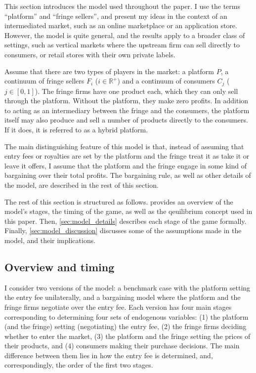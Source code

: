 \documentclass[a4paper]{article}
\begin{document}
This section introduces the model used throughout the paper.
I use the terms ``platform'' and ``fringe sellers'', and present my ideas in the context of an intermediated market, such as an online marketplace or an application store.
However, the model is quite general, and the results apply to a broader class of settings, such as vertical markets where the upstream firm can sell directly to consumers, or retail stores with their own private labels.

Assume that there are two types of players in the market: a platform $P$, a continuum of fringe sellers $F_i$ ($i \in \mathbb{R}^+$) and a continuum of consumers $C_j$ ($j \in [0, 1]$).
The fringe firms have one product each, which they can only sell through the platform.
Without the platform, they make zero profits.
In addition to acting as an intermediary between the fringe and the consumers, the platform itself may also produce and sell a number of products directly to the consumers.
If it does, it is referred to as a hybrid platform.

The main distinguishing feature of this model is that, instead of assuming that entry fees or royalties are set by the platform and the fringe treat it as take it or leave it offers, I assume that the platform and the fringe engage in some kind of bargaining over their total profits.
The bargaining rule, as well as other details of the model, are described in the rest of this section.

The rest of this section is structured as follows.
 provides an overview of the model's stages, the timing of the game, as well as the qeuilibrium concept used in this paper.
Then, \cref{sec:model_details} describes each stage of the game formally.
Finally, \cref{sec:model_discussion} discusses some of the assumptions made in the model, and their implications.

\subsection{Overview and timing}
\label{sec:model_overview}

I consider two versions of the model: a benchmark case with the platform setting the entry fee unilaterally, and a bargaining model where the platform and the fringe firms negotiate over the entry fee.
Each version has four main stages corresponding to determining four sets of endogenous variables: (1) the platform (and the fringe) setting (negotiating) the entry fee, (2) the fringe firms deciding whether to enter the market, (3) the platform and the fringe setting the prices of their products, and (4) consumers making their purchase decisions.
The main difference between them lies in how the entry fee is determined, and, correspondingly, the order of the first two stages.
\end{document}
